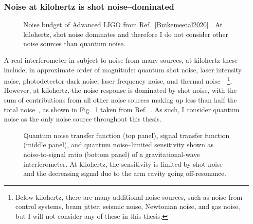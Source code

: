 \subsubsection{Noise at kilohertz is shot noise--dominated}

\begin{figure}
	\centering
	\caption{Noise budget of Advanced LIGO from Ref.~\ref{Buikemeetal2020} . At kilohertz, shot noise dominates and therefore I do not consider other noise sources than quantum noise.}
	\label{fig:Buikemeetal2020_LIGO_noise_budget}
\end{figure}


A real interferometer in subject to noise from many sources, at kilohertz these include, in approximate order of magnitude: quantum shot noise, laser intensity noise, photodetector dark noise, laser frequency noise, and thermal noise~\cite{Buikemeetal2020}~\footnote{Below kilohertz, there are many additional noise sources, such as noise from control systems, beam jitter, seismic noise, Newtonian noise, and gas noise, but I will not consider any of these in this thesis.}. However, at kilohertz, the noise response is dominated by shot noise, with the sum of contributions from all other noise sources making up less than half the total noise~\cite{}, as shown in Fig.~\ref{fig:Buikemeetal2020_LIGO_noise_budget} taken from Ref.~\cite{Buikemeetal2020}. As such, I consider quantum noise as the only noise source throughout this thesis. 

\begin{figure}
	\centering
	\caption{Quantum noise transfer function (top panel), signal transfer function (middle panel), and quantum noise--limited sensitivity shown as noise-to-signal ratio (bottom panel) of a gravitational-wave interferometer. At kilohertz, the sensitivity is limited by shot noise and the decreasing signal due to the arm cavity going off-resonance.}
	\label{fig:simplified_sensitivity}
\end{figure}

